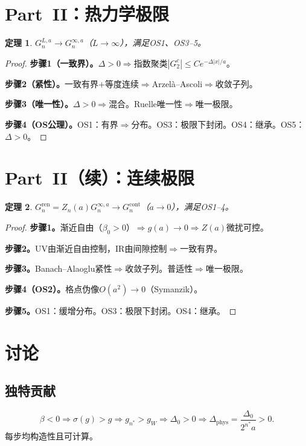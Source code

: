 \documentclass[12pt,a4paper]{article}
\theoremstyle{plain}
\newtheorem{theorem}{定理}[section]\newtheorem{lemma}[theorem]{引理}\newtheorem{corollary}[theorem]{推论}\newtheorem{proposition}[theorem]{命题}
\theoremstyle{definition}\newtheorem{definition}[theorem]{定义}
\theoremstyle{remark}\newtheorem{remark}[theorem]{注记}
\begin{document}
\section{Part~II：热力学极限}\label{sec:thermo}

\begin{theorem}\label{thm:thermo}
$G_n^{L,a}\to G_n^{\infty,a}$（$L\to\infty$），满足OS1、OS3--5。
\end{theorem}

\begin{proof}
\textbf{步骤1（一致界）。}$\Delta>0\Rightarrow$指数聚类$|G_2^c|\leq Ce^{-\Delta|x|/a}$。

\textbf{步骤2（紧性）。}一致有界$+$等度连续$\Rightarrow$Arzel\`a--Ascoli$\Rightarrow$收敛子列。

\textbf{步骤3（唯一性）。}$\Delta>0\Rightarrow$混合。Ruelle唯一性\cite{Ruelle1969}$\Rightarrow$唯一极限。

\textbf{步骤4（OS公理）。}OS1：有界$\Rightarrow$分布。OS3：极限下封闭\cite{OsterwalderSeiler1978}。OS4：继承。OS5：$\Delta>0$。
\end{proof}

\section{Part~II（续）：连续极限}\label{sec:contlim}

\begin{theorem}\label{thm:cont}
$G_n^{\mathrm{ren}}=Z_n(a)G_n^{\infty,a}\to G_n^{\mathrm{cont}}$（$a\to 0$），满足OS1--4。
\end{theorem}

\begin{proof}
\textbf{步骤1。}渐近自由（$\beta_0>0$）$\Rightarrow g(a)\to 0\Rightarrow Z(a)$微扰可控。

\textbf{步骤2。}UV由渐近自由控制，IR由间隙控制$\Rightarrow$一致有界。

\textbf{步骤3。}Banach--Alaoglu紧性$\Rightarrow$收敛子列。普适性$\Rightarrow$唯一极限。

\textbf{步骤4（OS2）。}格点伪像$O(a^2)\to 0$（Symanzik\cite{Symanzik1983}）。

\textbf{步骤5。}OS1：缓增分布。OS3：极限下封闭。OS4：继承。
\end{proof}


\section{讨论}\label{sec:discuss}
\subsection{独特贡献}
\begin{equation}\label{eq:chain6b}
\beta<0\Rightarrow\sigma(g)>g\Rightarrow g_{n^*}>g_W\Rightarrow\Delta_0>0\Rightarrow\Delta_{\mathrm{phys}}=\frac{\Delta_0}{2^{n^*}a}>0.
\end{equation}
每步均构造性且可计算。
\end{document}
